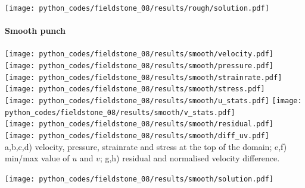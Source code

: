 \newpage
\texttt{[image: python\_codes/fieldstone\_08/results/rough/solution.pdf]}


\newpage
\paragraph{Smooth punch}

\begin{center}
\texttt{[image: python\_codes/fieldstone\_08/results/smooth/velocity.pdf]}
\texttt{[image: python\_codes/fieldstone\_08/results/smooth/pressure.pdf]}\\
\texttt{[image: python\_codes/fieldstone\_08/results/smooth/strainrate.pdf]}
\texttt{[image: python\_codes/fieldstone\_08/results/smooth/stress.pdf]}\\
\texttt{[image: python\_codes/fieldstone\_08/results/smooth/u\_stats.pdf]}
\texttt{[image: python\_codes/fieldstone\_08/results/smooth/v\_stats.pdf]}\\
\texttt{[image: python\_codes/fieldstone\_08/results/smooth/residual.pdf]}
\texttt{[image: python\_codes/fieldstone\_08/results/smooth/diff\_uv.pdf]}\\
{\captionfont a,b,c,d) velocity, pressure, strainrate and stress at the top of the domain; 
e,f) min/max value of $u$ and $v$;
g,h) residual and normalised velocity difference.}
\end{center}

\newpage
\texttt{[image: python\_codes/fieldstone\_08/results/smooth/solution.pdf]}




